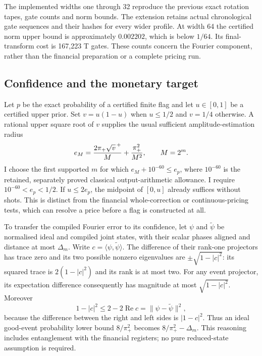 The implemented widths one through 32 reproduce the previous exact
rotation tapes, gate counts and norm bounds. The extension retains actual
chronological gate sequences and their hashes for every wider profile.
At width 64 the certified norm upper bound is approximately $0.002202$,
which is below $1/64$. Its final-transform cost is 167,223 T gates.
These counts concern the Fourier component, rather than the financial
preparation or a complete pricing run.

\subsection{Confidence and the monetary target}

Let $p$ be the exact probability of a certified finite flag and let
$u\in[0,1]$ be a certified upper prior. Set
$v=u(1-u)$ when $u\leq1/2$ and $v=1/4$ otherwise. A rational upper
square root of $v$ supplies the usual sufficient amplitude-estimation
radius
\begin{equation}
 e_M={2\pi_+\sqrt{v}^{\,+}\over M}+{\pi_+^2\over M^2},
 \qquad M=2^m.
 \label{eq:integral-canonical-radius}
\end{equation}
I choose the first supported $m$ for which
$e_M+10^{-60}\leq e_p$, where $10^{-60}$ is the retained, separately
proved classical output-arithmetic allowance. I require
$10^{-60}<e_p<1/2$. If $u\leq2e_p$, the midpoint of $[0,u]$ already
suffices without shots. This is distinct from the financial whole-correction
or continuous-pricing tests, which can resolve a price before a flag is
constructed at all.

To transfer the compiled Fourier error to its confidence, let $\psi$ and
$\widetilde\psi$ be normalised ideal and compiled joint states, with their
scalar phases aligned and distance at most $\Delta_m$. Write
$c=\langle\psi,\widetilde\psi\rangle$. The difference of their rank-one
projectors has trace zero and its two possible nonzero eigenvalues are
$\pm\sqrt{1-|c|^2}$: its squared trace is $2(1-|c|^2)$ and its rank is at
most two. For any event projector, its expectation difference consequently
has magnitude at most $\sqrt{1-|c|^2}$. Moreover
\[
 1-|c|^2\leq2-2\operatorname{Re}c
       =\|\psi-\widetilde\psi\|^2,
\]
because the difference between the right and left sides is $|1-c|^2$.
Thus an ideal good-event probability lower bound $8/\pi_+^2$ becomes
$8/\pi_+^2-\Delta_m$. This reasoning includes entanglement with the
financial registers; no pure reduced-state assumption is required.

